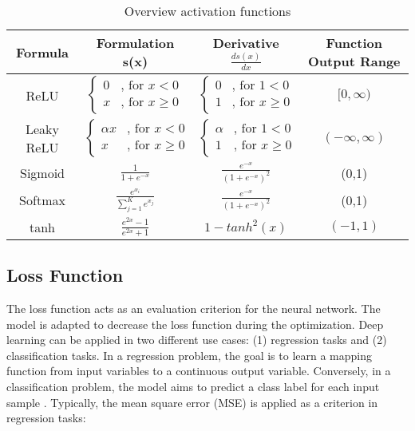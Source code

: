 \begin {table}[H]
\begin{tabular}{ c c c c }
\toprule 
Formula & Formulation s(x) & Derivative $\frac{ds(x)}{dx}$ & Function Output Range \\
\midrule 
ReLU &   $\begin{cases} 0 & \text{, for }x < 0\\
	x & \text{, for }x \geqslant 0 \end{cases}$ & $\begin{cases} 0 & \text{, for }1 < 0\\
	1 & \text{, for }x \geqslant 0 \end{cases}$ & $[ 0, \infty)$\\

\rule{0pt}{5ex}%

Leaky ReLU &   $\begin{cases} \alpha x & \text{, for }x < 0\\
	x & \text{, for }x \geqslant 0 \end{cases}$ & $\begin{cases} \alpha & \text{, for }1 < 0\\
	1 & \text{, for }x \geqslant 0 \end{cases}$ & $(- \infty, \infty)$\\

\rule{0pt}{5ex}%

Sigmoid & $\frac{1}{1+e^{-x}}$ & $\frac{e^{-x}}{(1+e^{-x})^{2}}$ & (0,1)\\

\rule{0pt}{5ex}%

Softmax & $\frac{e^{x_{i}}}{\sum_{j=1}^{K} e^{x_{j}}}$ & $\frac{e^{-x}}{(1+e^{-x})^{2}}$ & (0,1)\\

\rule{0pt}{5ex}%

tanh & $\frac{e^{2x}-1}{e^{2x}+1}$ & $1-tanh^{2}(x)$ & $(-1,1)$ \\
\bottomrule  

\end{tabular}
\caption {Overview activation functions \cite{ShilohPerl2020}} \label{tab:activation_functions}
\end {table}


\subsection{Loss Function}
The loss function acts as an evaluation criterion for the neural network. The model is adapted to decrease the loss function during the optimization. Deep learning can be applied in two different use cases: (1) regression tasks and (2) classification tasks. In a regression problem, the goal is to learn a mapping function from input variables to a continuous output variable. Conversely, in a classification problem, the model aims to predict a class label for each input sample \cite{ShilohPerl2020}. Typically, the mean square error (MSE) is applied as a criterion in regression tasks:

